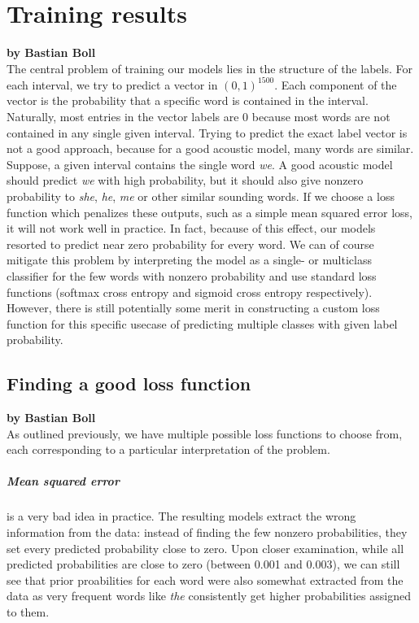 \chapter{Training results}
\label{results}

\textbf{by Bastian Boll} \\

The central problem of training our models lies in the structure of the labels. For each interval, we try to predict a vector in $(0,1)^{1500}$. Each component of the vector is the probability that a specific word is contained in the interval. Naturally, most entries in the vector labels are 0 because most words are not contained in any single given interval. Trying to predict the exact label vector is not a good approach, because for a good acoustic model, many words are similar. Suppose, a given interval contains the single word \emph{we}. A good acoustic model should predict \emph{we} with high probability, but it should also give nonzero probability to \emph{she}, \emph{he}, \emph{me} or other similar sounding words. If we choose a loss function which penalizes these outputs, such as a simple mean squared error loss, it will not work well in practice. In fact, because of this effect, our models resorted to predict near zero probability for every word. We can of course mitigate this problem by interpreting the model as a single- or multiclass classifier for the few words with nonzero probability and use standard loss functions (softmax cross entropy and sigmoid cross entropy respectively). However, there is still potentially some merit in constructing a custom loss function for this specific usecase of predicting multiple classes with given label probability.

\section{Finding a good loss function}

\textbf{by Bastian Boll} \\

As outlined previously, we have multiple possible loss functions to choose from, each corresponding to a particular interpretation of the problem.

\paragraph{Mean squared error} is a very bad idea in practice. The resulting models extract the wrong information from the data: instead of finding the few nonzero probabilities, they set every predicted probability close to zero. Upon closer examination, while all predicted probabilities are close to zero (between 0.001 and 0.003), we can still see that prior proabilities for each word were also somewhat extracted from the data as very frequent words like \emph{the} consistently get higher probabilities assigned to them.

